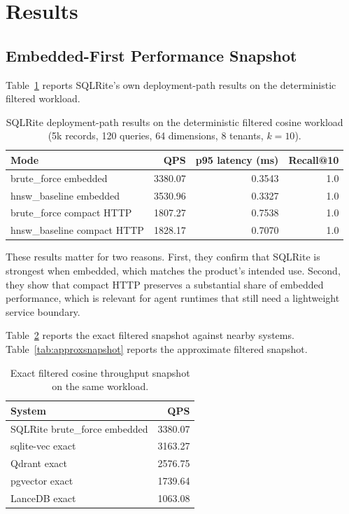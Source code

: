 \documentclass[11pt]{article}
\begin{document}
\section{Results}
\subsection{Embedded-First Performance Snapshot}
Table~\ref{tab:sqlritepaths} reports SQLRite's own deployment-path results on the deterministic filtered workload.

\begin{table}[H]
  \centering
  \small
  \caption{SQLRite deployment-path results on the deterministic filtered cosine workload (5k records, 120 queries, 64 dimensions, 8 tenants, \(k=10\)).}
  \label{tab:sqlritepaths}
  \begin{tabular}{lrrr}
    \toprule
    Mode & QPS & p95 latency (ms) & Recall@10 \\
    \midrule
    brute\_force embedded & 3380.07 & 0.3543 & 1.0 \\
    hnsw\_baseline embedded & 3530.96 & 0.3327 & 1.0 \\
    brute\_force compact HTTP & 1807.27 & 0.7538 & 1.0 \\
    hnsw\_baseline compact HTTP & 1828.17 & 0.7070 & 1.0 \\
    \bottomrule
  \end{tabular}
\end{table}

These results matter for two reasons. First, they confirm that SQLRite is strongest when embedded, which matches the product's intended use. Second, they show that compact HTTP preserves a substantial share of embedded performance, which is relevant for agent runtimes that still need a lightweight service boundary.

Table~\ref{tab:exactsnapshot} reports the exact filtered snapshot against nearby systems. Table~\ref{tab:approxsnapshot} reports the approximate filtered snapshot.

\begin{table}[H]
  \centering
  \small
  \caption{Exact filtered cosine throughput snapshot on the same workload.}
  \label{tab:exactsnapshot}
  \begin{tabular}{lr}
    \toprule
    System & QPS \\
    \midrule
    SQLRite brute\_force embedded & 3380.07 \\
    sqlite-vec exact & 3163.27 \\
    Qdrant exact & 2576.75 \\
    pgvector exact & 1739.64 \\
    LanceDB exact & 1063.08 \\
    \bottomrule
  \end{tabular}
\end{table}
\end{document}
